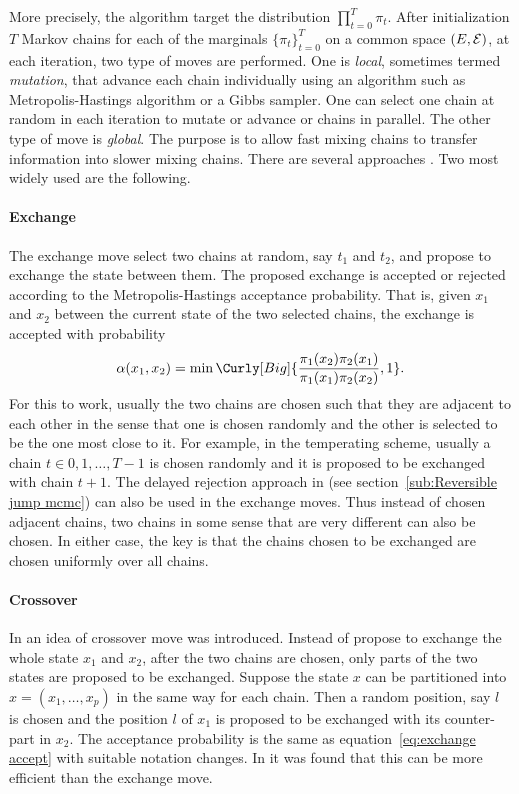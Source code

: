 More precisely, the algorithm target the distribution $\prod_{t=0}^T\pi_t$.
After initialization $T$ Markov chains for each of the marginals
$\{\pi_t\}_{t=0}^T$ on a common space $(E,\mathcal{E})$, at each iteration, two type
of moves are performed. One is \emph{local}, sometimes termed \emph{mutation},
that advance each chain individually using an \mcmc algorithm such as
Metropolis-Hastings algorithm or a Gibbs sampler. One can select one chain at
random in each iteration to mutate or advance or chains in parallel. The other
type of move is \emph{global}. The purpose is to allow fast mixing chains to
transfer information into slower mixing chains. There are several approaches
\cite{Jasra:2007in}. Two most widely used are the following.

\paragraph{Exchange} The exchange move select two chains at random, say $t_1$
and $t_2$, and propose to exchange the state between them. The proposed
exchange is accepted or rejected according to the Metropolis-Hastings
acceptance probability. That is, given $x_1$ and $x_2$ between the current
state of the two selected chains, the exchange is accepted with probability
\begin{equation}
  \alpha(x_1, x_2) =
  \min\Curly[Big]{\frac{\pi_1(x_2)\pi_2(x_1)}{\pi_1(x_1)\pi_2(x_2)}, 1}.
  \label{eq:exchange accept}
\end{equation}
For this to work, usually the two chains are chosen such that they are
adjacent to each other in the sense that one is chosen randomly and the other
is selected to be the one most close to it. For example, in the temperating
scheme, usually a chain $t\in{0,1,\dots,T-1}$ is chosen randomly and it is
proposed to be exchanged with chain $t+1$. The delayed rejection approach in
\cite{Green:2001tk} (see section~\ref{sub:Reversible jump mcmc}) can also be
used in the exchange moves. Thus instead of chosen adjacent chains, two chains
in some sense that are very different can also be chosen. In either case, the
key is that the chains chosen to be exchanged are chosen uniformly over all
chains.

\paragraph{Crossover} In \cite{Liang:2001dc} an idea of crossover move was
introduced. Instead of propose to exchange the whole state $x_1$ and $x_2$,
after the two chains are chosen, only parts of the two states are proposed to
be exchanged. Suppose the state $x$ can be partitioned into $x =
(x_1,\dots,x_p)$ in the same way for each chain. Then a random position, say
$l$ is chosen and the position $l$ of $x_1$ is proposed to be exchanged with
its counter-part in $x_2$. The acceptance probability is the same as
equation~\eqref{eq:exchange accept} with suitable notation changes. In
\cite{Jasra:2007in} it was found that this can be more efficient than the
exchange move.

